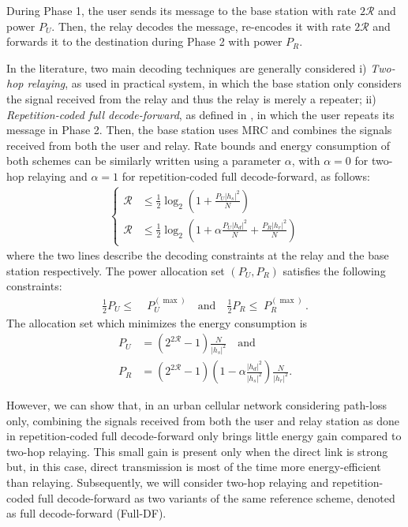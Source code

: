 \documentclass[journal]{IEEEtran}
\theoremstyle{definition}
\begin{document}
During Phase 1, the user sends its message to the base station with rate $2\mathcal{R}$ and power $P_U$. Then, the relay decodes the message, re-encodes it with rate $2\mathcal{R}$ and forwards it to the destination during Phase 2 with power $P_R$.

In the literature, two main decoding techniques are generally considered
i) \textit{Two-hop relaying}, as used in practical system, in which the base station only considers the signal received from the relay and thus the relay is merely a repeater;
ii) \textit{Repetition-coded full decode-forward}, as defined in \cite{laneman2004}, in which the user repeats its message in Phase 2. Then, the base station uses MRC and combines the signals received from both the user and relay.
Rate bounds and energy consumption of both schemes can be similarly written using a parameter $\alpha$, with $\alpha = 0$ for two-hop relaying and $\alpha = 1$ for repetition-coded full decode-forward, as follows: 
\begin{align}
\left \lbrace
\begin{array}{rl}
\mathcal{R} &\leq \frac{1}{2} \log_2 \left(1+ \frac{P_U \vert {h}_s \vert^2}{N} \right) \\
\mathcal{R} &\leq \frac{1}{2} \log_2 \left(1+ \alpha \frac{P_U \vert {h}_d \vert^2}{N} +\frac{P_R \vert {h}_r \vert^2}{N} \right) 
\end{array}
\right. 
\end{align}
where the two lines describe the decoding constraints at the relay and the base station respectively. The power allocation set $(P_U,P_R)$ satisfies the following constraints:
\begin{align}
\frac{1}{2} P_U \leq & \; P_U^{(\max)}  
\quad \text{and} \quad
\frac{1}{2} P_R \leq \; P_R^{(\max)} \, .
\end{align}
The allocation set which minimizes the energy consumption is  \vspace*{-12pt}
\begin{equation}
\begin{split}
P_U &= \left(2^{2 \mathcal{R}} -1\right) \frac{N}{\vert h_s \vert^2 }
\quad \text{and} \\
P_R &= \left(2^{2 \mathcal{R}} - 1 \right)\left( 1- \alpha \frac{\vert h_d \vert^2}{\vert h_s \vert^2}\right)  \frac{N}{\vert h_r \vert^2 } .
\label{eq:allocation_FullDF}
\end{split}
\end{equation}

However, we can show that, in an urban cellular network considering path-loss only, combining the signals received from both the user and relay station as done in repetition-coded full decode-forward only brings little energy gain compared to two-hop relaying. 
This small gain is present only when the direct link is strong but, in this case, direct transmission is most of the time more energy-efficient than relaying.
Subsequently, we will consider two-hop relaying and repetition-coded full decode-forward as two variants of the same reference scheme, denoted as full decode-forward (Full-DF).
\end{document}
